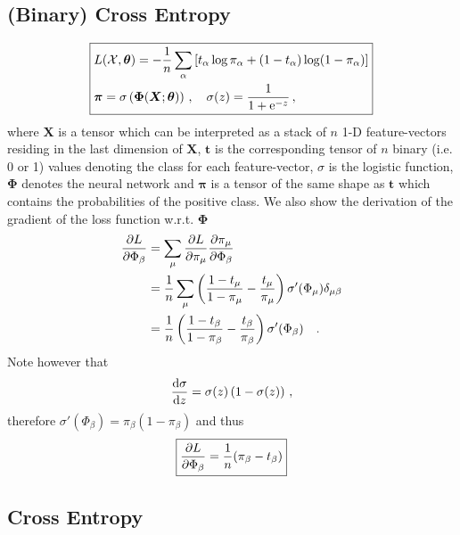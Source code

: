 \documentclass{myclass}
\begin{document}
\subsection{(Binary) Cross Entropy}

\[
\boxed{
\begin{split} 
   & L(\mathcal{X}, \bm{\theta}) = -\frac{1}{n} \sum_{\alpha} \left[ t_\alpha \log\pi_\alpha + (1-t_\alpha)\log(1-\pi_\alpha) \right] \\
   & \bm{\pi} = \sigma\left( \bm{\Phi}(\bm{X}; \bm{\theta})\right)\,,\quad \sigma(z) = \frac{1}{1 + \mathrm{e}^{-z}}\,,
\end{split}
}
\] 
where \(\bm{X}\) is a tensor which can be interpreted as a stack of \(n\) 1-D feature-vectors
residing in the last dimension of \(\bm{X}\), \(\bm{t}\) is the corresponding tensor of \(n\) binary
(i.e. 0 or 1) values denoting the class for each feature-vector, \(\sigma\) is the logistic
function, \(\bm{\Phi}\) denotes the neural network and \(\bm{\pi}\) is a tensor of the same shape as
\(\bm{t}\) which contains the probabilities of the positive class.  We also show the derivation of
the gradient of the loss function w.r.t. \(\bm{\Phi}\)
\[
\begin{split}
   \pdv{L}{\Phi_\beta} &= \sum_{\mu} \pdv{L}{\pi_{\mu}} \pdv{\pi_{\mu}}{\Phi_\beta} \\
                       &= \frac{1}{n}\sum_{\mu} \left( \frac{1-t_\mu}{1 - \pi_\mu} - \frac{t_{\mu}}{\pi_{\mu}} \right) \sigma'(\Phi_\mu) \delta_{\mu\beta} \\
                       &= \frac{1}{n} \left( \frac{1-t_\beta}{1 - \pi_\beta} - \frac{t_{\beta}}{\pi_{\beta}}\right) \sigma'(\Phi_\beta)\quad.
\end{split}
\]
Note however that
\[
   \dv{\sigma}{z} = \sigma(z)\left(1 - \sigma(z)\right)\,,
\]
therefore \(\sigma'(\Phi_\beta) = \pi_\beta (1 - \pi_\beta)\) and thus
\[
\boxed{\pdv{L}{\Phi_\beta} = \frac{1}{n}(\pi_\beta - t_\beta)}
\]


\subsection{Cross Entropy}
\end{document}
